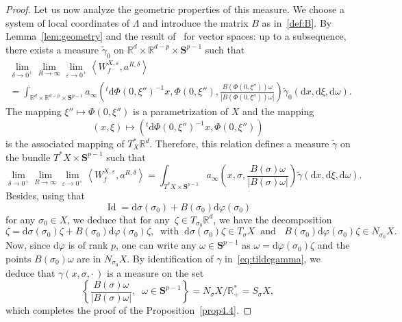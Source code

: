 \documentclass[AHL,Unicode,longabstracts]{cedram}
\DeclareMathOperator{\Id}{Id}
\newcommand*\R{{\mathbb R}}
\newcommand*\eps{\varepsilon}
\numberwithin{equation}{section}
\newcommand*{\dd}{\mathrm{d}}
\newcommand*{\dx}{\dd x}
\newcommand*{\dxi}{\dd \xi}
\newcommand*{\dsigma}{\dd \sigma}
\newcommand*{\domega}{\dd \omega}
\newcommand*{\dphi}{\dd \varphi}
\newcommand*{\dPhi}{\dd \Phi} %
\begin{document}
\begin{proof}
Let us now analyze the geometric properties of this measure. We choose a system of local coordinates of $\Lambda$ and introduce the matrix $B$ as in~\eqref{def:B}. By Lemma~\ref{lem:geometry} and the result of~\cite{CFMProc} for vector spaces: up to a subsequence, there exists a measure $\widetilde\gamma_0$ on $\R^d\times \R^{d-p} \times \mathbf{S}^{p-1}$ such that
\begin{multline*}
\lim_{\delta\to 0^+}\lim_{R\to\infty} \lim_{\eps\to 0^+}\left\langle W^{X,\eps}_{f},a^{R,\delta}\right\rangle\\
=
\int_{\R^d\times \R^{d-p} \times \mathbf{S}^{p-1}} a_\infty\left(^t \dPhi (0,\xi'')^{-1} x,\Phi(0,\xi''),\frac{B\left(\Phi(0,\xi'')\right) \omega}{|B\left(\Phi(0,\xi'')\right) \omega |}\right)\widetilde\gamma_0(\dx,\dxi,\domega).
\end{multline*}
The mapping $\xi''\mapsto \Phi(0,\xi'')$ is a parametrization of $X$ and the mapping
\[
(x,\xi)\mapsto \left(^t \dPhi (0,\xi'')^{-1} x,\Phi(0,\xi'')\right)
\]
is the associated mapping of $T^*_X\R^d$. Therefore, this relation defines a measure $\widetilde\gamma$ on the bundle $T^*X\times \mathbf{S}^{p-1}$ such that
\begin{equation}\label{eq:tildegamma}
\lim_{\delta\to 0^+}\lim_{R\to\infty} \lim_{\eps\to 0^+}\left\langle W^{X,\eps}_{f},a^{R,\delta}\right\rangle =
\int_{T^*X\times \mathbf{S}^{p-1}} a_\infty\left(x,\sigma,\frac{B\left(\sigma\right) \omega}{|B\left(\sigma\right) \omega |}\right)\widetilde\gamma(\dx,\dxi,\domega).
\end{equation}
Besides, using that
\begin{equation}\label{dsigma}
{\Id} = \dsigma(\sigma_0) + B(\sigma_0) \dphi(\sigma_0)
\end{equation}
for any $\sigma_0\in X$, we deduce that for any~$\zeta\in T_{\sigma_0}\R^d$, we have the decomposition
\[
\zeta= \dsigma(\sigma_0) \zeta + B(\sigma_0) \dphi(\sigma_0)\zeta,\;\;\text{with}\;\;\dsigma(\sigma_0) \zeta \in T_\sigma X\;\;\text{and }\;\;B(\sigma_0) \dphi(\sigma_0)\zeta\in N_{\sigma_0} X.
\]
Now, since $\dphi$ is of rank $p$, one can write any $\omega\in \mathbf{S}^{p-1}$ as $\omega=\dphi(\sigma_0)\zeta$ and the points $B(\sigma_0)\omega$ are in $N_{\sigma_0} X$. By identification of $\gamma$ in~\eqref{eq:tildegamma}, we deduce that $\gamma(x,\sigma,\cdot\,)$ is a measure on the set
\[
\left\{ \frac{B\left(\sigma\right) \omega}{|B\left(\sigma\right) \omega |},\;\;\omega\in \mathbf{S}^{p-1}\right\}= {N_\sigma X}/{\R^*_+}=S_\sigma X,
\]
which completes the proof of the Proposition~\ref{prop4.4}.
\end{proof}
\end{document}
